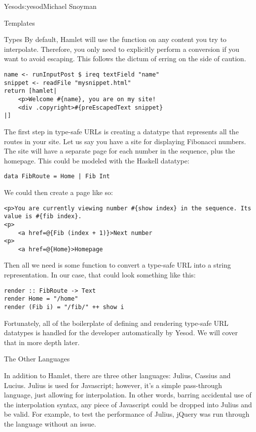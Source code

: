 \begin{aosachapter}{Yesod}{s:yesod}{Michael Snoyman}
\begin{aosasect1}{Templates}
\begin{aosasect2}{Types}
By default, Hamlet will use the  function on any
content you try to interpolate. Therefore, you only need to explicitly
perform a conversion if you want to avoid escaping. This follows the
dictum of erring on the side of caution.

\begin{verbatim}
name <- runInputPost $ ireq textField "name"
snippet <- readFile "mysnippet.html"
return [hamlet|
    <p>Welcome #{name}, you are on my site!
    <div .copyright>#{preEscapedText snippet}
|]
\end{verbatim}

The first step in type-safe URLs is creating a datatype that
represents all the routes in your site. Let us say you have a site for
displaying Fibonacci numbers. The site will have a separate page for
each number in the sequence, plus the homepage. This could be modeled
with the Haskell datatype:

\begin{verbatim}
data FibRoute = Home | Fib Int
\end{verbatim}

\noindent We could then create a page like so:

\begin{verbatim}
<p>You are currently viewing number #{show index} in the sequence. Its value is #{fib index}.
<p>
    <a href=@{Fib (index + 1)}>Next number
<p>
    <a href=@{Home}>Homepage
\end{verbatim}

\noindent Then all we need is some function to convert a type-safe URL into a
string representation. In our case, that could look something like
this:

\begin{verbatim}
render :: FibRoute -> Text
render Home = "/home"
render (Fib i) = "/fib/" ++ show i
\end{verbatim}

Fortunately, all of the boilerplate of defining and rendering
type-safe URL datatypes is handled for the developer automatically by
Yesod. We will cover that in more depth later.

\end{aosasect2}

\begin{aosasect2}{The Other Languages}

In addition to Hamlet, there are three other languages: Julius, Cassius 
and Lucius.  Julius is used
for Javascript; however, it's a simple pass-through language, just
allowing for interpolation. In other words, barring accidental use of
the interpolation syntax, any piece of Javascript could be dropped
into Julius and be valid. For example, to test the performance of
Julius, jQuery was run through the language without an issue.


\end{aosasect2}
\end{aosasect1}
\end{aosachapter}
